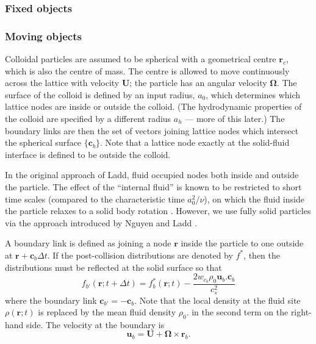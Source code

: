\subsubsection{Fixed objects}

\subsubsection{Moving objects}

Colloidal particles are assumed to be spherical with a geometrical
centre $\mathbf{r}_c$, which is also the centre of mass. The
centre is allowed to move continuously across the lattice
with velocity $\mathbf{U}$; the particle has an angular velocity
$\mathbf{\Omega}$. The surface of the colloid is defined by an
input radius, $a_0$, which determines which lattice nodes are
inside or outside the colloid. (The hydrodynamic properties of
the colloid are specified by a different radius $a_h$ --- more
of this later.) The boundary links are then the set of vectors
joining lattice nodes which intersect the spherical surface
$\{\mathbf{c}_b\}$. Note that a lattice node exactly at
the solid-fluid interface is defined to be outside the colloid.

In the original approach of Ladd, fluid occupied nodes both inside
and outside the particle. The effect of the ``internal fluid'' is
known to be restricted to short time scales (compared to the
characteristic time $a_0^2/\nu$), on which the fluid inside the
particle relaxes to a solid body rotation \cite{heemels}. However,
we use fully solid particles via the approach introduced by
Nguyen and Ladd \cite{nguyen-ladd2002}.



A boundary link is defined as joining a node $\mathbf{r}$
inside the particle to one outside at $\mathbf{r} + \mathbf{c}_b \Delta t$.
If the post-collision distributions are denoted by $f^\ast$, then
the distributions must be reflected at the solid surface so that
\begin{equation}
\label{eq:colloid_bbl1}
f_{b'}(\mathbf{r}; t + \Delta t) = f_b^\ast (\mathbf{r}; t)
- \frac{2w_{c_b} \rho_0 \mathbf{u}_b.\mathbf{c}_b}{c_s^2}
\end{equation}
where the boundary link $\mathbf{c}_{b'} = -\mathbf{c}_b$.
Note that the local density at the fluid site $\rho(\mathbf{r};t)$
is replaced by
the mean fluid density $\rho_0$. in the second term on the right-hand side.
The velocity at the boundary is
\begin{equation}
\label{eq-colloid-ub}
\mathbf{u}_b = \mathbf{U} + \mathbf{\Omega}\times\mathbf{r}_b.
\end{equation}

